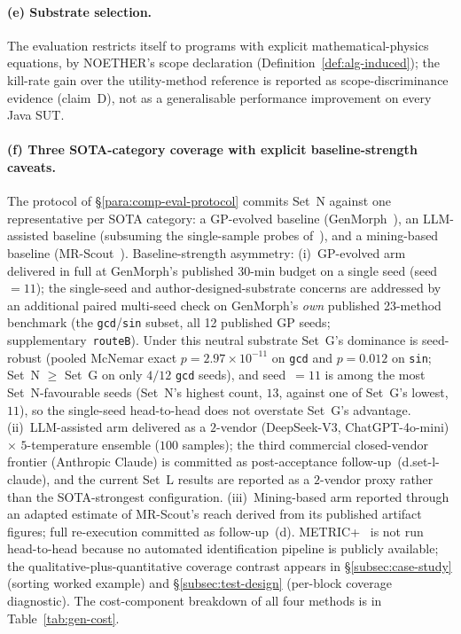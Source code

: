 \documentclass[manuscript]{acmart}
\begin{document}
\paragraph{(e) Substrate selection.}
The evaluation restricts itself to programs with explicit mathematical-physics equations, by NOETHER's scope declaration (Definition~\ref{def:alg-induced}); the kill-rate gain over the utility-method reference is reported as scope-discriminance evidence (claim~D), not as a generalisable performance improvement on every Java SUT.

\paragraph{(f) Three SOTA-category coverage with explicit baseline-strength caveats.}
The protocol of \S\ref{para:comp-eval-protocol} commits Set~N against one representative per SOTA category: a GP-evolved baseline (GenMorph~\cite{GenMorph2024}), an LLM-assisted baseline (subsuming the single-sample probes of~\cite{Shin2024,ZhangChatGPTMR2023,GPTMR2025,AutoMT2025}), and a mining-based baseline (MR-Scout~\cite{MRScout2024}). Baseline-strength asymmetry: (i)~GP-evolved arm delivered in full at GenMorph's published 30-min budget on a single seed (seed~$=11$); the single-seed and author-designed-substrate concerns are addressed by an additional paired multi-seed check on GenMorph's \emph{own} published 23-method benchmark (the \texttt{gcd}/\texttt{sin} subset, all 12 published GP seeds; supplementary~\texttt{routeB}). Under this neutral substrate Set~G's dominance is seed-robust (pooled McNemar exact $p = 2.97\times10^{-11}$ on \texttt{gcd} and $p = 0.012$ on \texttt{sin}; Set~N $\geq$ Set~G on only $4/12$ \texttt{gcd} seeds), and seed~$=11$ is among the most Set~N-favourable seeds (Set~N's highest count, $13$, against one of Set~G's lowest, $11$), so the single-seed head-to-head does not overstate Set~G's advantage. (ii)~LLM-assisted arm delivered as a $2$-vendor (DeepSeek-V3, ChatGPT-4o-mini) $\times$ $5$-temperature ensemble ($100$ samples); the third commercial closed-vendor frontier (Anthropic Claude) is committed as post-acceptance follow-up~(d.set-l-claude), and the current Set~L results are reported as a $2$-vendor proxy rather than the SOTA-strongest configuration. (iii)~Mining-based arm reported through an adapted estimate of MR-Scout's reach derived from its published artifact figures; full re-execution committed as follow-up~(d). METRIC+~\cite{SunMETRICplus2021} is not run head-to-head because no automated identification pipeline is publicly available; the qualitative-plus-quantitative coverage contrast appears in \S\ref{subsec:case-study} (sorting worked example) and \S\ref{subsec:test-design} (per-block coverage diagnostic). The cost-component breakdown of all four methods is in Table~\ref{tab:gen-cost}.
\end{document}
